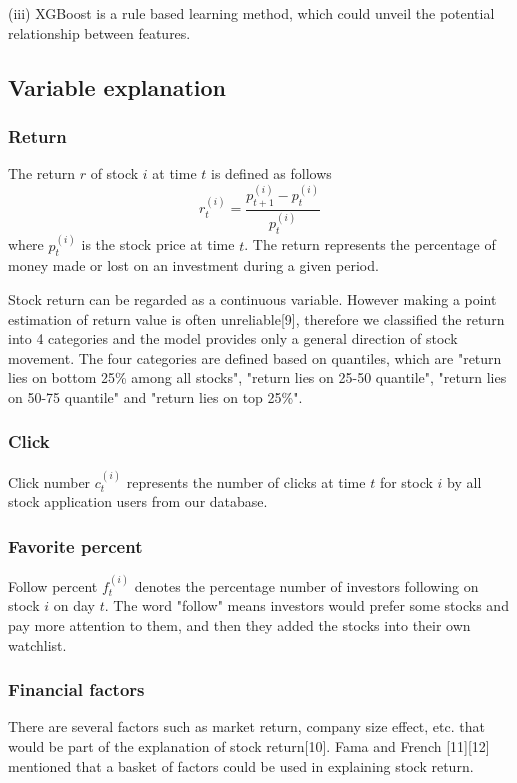 \documentclass[letterpaper]{article}
\begin{document}
(iii) XGBoost is a rule based learning method, which could unveil the potential relationship between features.


\subsection{Variable explanation}
\subsubsection{Return}
The return $r$ of stock $i$ at time $t$ is defined as follows
$$
r_{t}^{(i)}=\frac{p_{t+1}^{(i)}-p_{t}^{(i)}}{p_{t}^{(i)}}
$$
where $p_{t}^{(i)}$ is the stock price at time $t$. The return represents the percentage of money made or lost on an investment during a given period.

Stock return can be regarded as a continuous variable. However making a point estimation of return value is often unreliable[9], therefore we classified the return into 4 categories and the model provides only a general direction of stock movement. The four categories are defined based on quantiles, which are "return lies on bottom 25\% among all stocks", "return lies on 25-50 quantile", "return lies on 50-75 quantile" and "return lies on top 25\%". 
\subsubsection{Click}

Click number $c^{(i)}_{t}$ represents the number of clicks at time $t$ for stock $i$ by all stock application users from our database.

\subsubsection{Favorite percent}

Follow percent $f^{(i)}_{t}$ denotes the percentage number of investors following on stock $i$ on day $t$. The word "follow" means investors would prefer some stocks and pay more attention to them, and then they added the stocks into their own watchlist. 


\subsubsection{Financial factors}

There are several factors such as market return, company size effect, etc. that would be part of the explanation of stock return[10]. Fama and French [11][12] mentioned that a basket of factors could be used in explaining stock return. 
\end{document}

